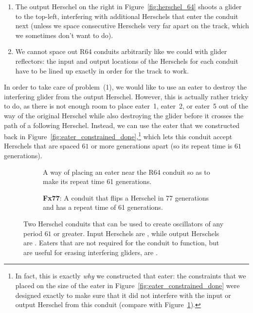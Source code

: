 \begin{enumerate}
	\item[1)] The output Herschel on the right in Figure~\ref{fig:herschel_64} shoots a glider to the top-left, interfering with additional Herschels that enter the conduit next (unless we space consecutive Herschels very far apart on the track, which we sometimes don't want to do).\smallskip
	
	\item[2)] We cannot space out R64 conduits arbitrarily like we could with glider reflectors: the input and output locations of the Herschels for each conduit have to be lined up exactly in order for the track to work.\medskip
\end{enumerate}

In order to take care of problem~(1), we would like to use an eater to destroy the interfering glider from the output Herschel. However, this is actually rather tricky to do, as there is not enough room to place eater~1, eater~2, or eater~5 out of the way of the original Herschel while also destroying the glider before it crosses the path of a following Herschel. Instead, we can use the eater that we constructed back in Figure~\ref{fig:eater_constrained_done},\footnote{In fact, this is exactly \emph{why} we constructed that eater: the constraints that we placed on the size of the eater in Figure~\ref{fig:eater_constrained_done} were designed exactly to make sure that it did not interfere with the input or output Herschel from this conduit (compare with Figure~\ref{fig:R64}).} which lets this conduit accept Herschels that are spaced $61$ or more generations apart (so its repeat time is $61$ generations).

\begin{figure}[!htb]
	\centering
	\begin{subfigure}{.48\textwidth}
		\centering
		\caption{A way of placing an eater near the R64 conduit so as to make its repeat time 61 generations.}
		\label{fig:R64}
	\end{subfigure} \hfill %
	\begin{subfigure}{.48\textwidth}
		\centering
		\caption{\textbf{Fx77}: A conduit that flips a Herschel in 77 generations and has a repeat time of 61 generations.}
		\label{fig:Fx77}
	\end{subfigure}
	\caption{Two Herschel conduits that can be used to create oscillators of any period $61$ or greater. Input Herschels are , while output Herschels are . Eaters that are not required for the conduit to function, but are useful for erasing interfering gliders, are .}
	\label{fig:herschel_conduits}
\end{figure}

